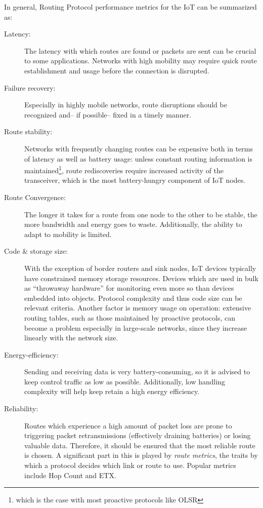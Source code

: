 \documentclass{acm_proc_article-sp}
\begin{document}
In general, Routing Protocol performance metrics for the IoT can be summarized as:
\begin{description}
\item[Latency:] The latency with which routes are found or packets are sent can be crucial to some applications. Networks with high mobility may require quick route establishment and usage before the connection is disrupted.
\item[Failure recovery:] Especially in highly mobile networks, route disruptions should be recognized and-- if possible-- fixed in a timely manner.
\item[Route stability:] Networks with frequently changing routes can be expensive both in terms of latency as well as battery usage: unless constant routing information is maintained\footnote{ which is the case with most proactive protocols like OLSR\cite{RFC-3626}}, route rediscoveries require increased activity of the transceiver, which is the most battery-hungry component of IoT nodes.
\item[Route Convergence:] The longer it takes for a route from one node to the other to be stable, the more bandwidth and energy goes to waste. Additionally, the ability to adapt to mobility is limited. %
\item[Code \& storage size:] With the exception of border routers and sink nodes, IoT devices typically have constrained memory storage resources. Devices which are used in bulk as ``throwaway hardware'' for monitoring even more so than devices embedded into objects. Protocol complexity and thus code size can be relevant criteria. Another factor is memory usage on operation: extensive routing tables, such as those maintained by proactive protocols, can become a problem especially in large-scale networks, since they increase linearly with the network size. %
\item[Energy-efficiency:] Sending and receiving data is very battery-consuming, so it is advised to keep control traffic as low as possible. Additionally, low handling complexity will help keep retain a high energy efficiency.
\item[Reliability:] Routes which experience a high amount of packet loss are prone to triggering packet retransmissions (effectively draining batteries) or losing valuable data. Therefore, it should be ensured that the most reliable route is chosen. A significant part in this is played by \emph{route metrics}, the traits by which a protocol decides which link or route to use. Popular metrics include Hop Count and \gls{ETX}.
\end{description}
\end{document}
